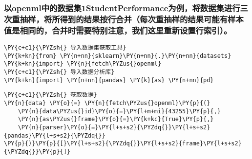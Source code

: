     \hypertarget{ux4ee5openmlux4e2dux7684ux6570ux636eux96c61studentperformanceux4e3aux4f8bux5c06ux6570ux636eux96c6ux8fdbux884cux4e09ux6b21ux91cdux62bdux6837ux5c06ux6240ux5f97ux5230ux7684ux7ed3ux679cux6309ux884cux5408ux5e76ux6bcfux6b21ux91cdux62bdux6837ux7684ux7ed3ux679cux53efux80fdux6709ux6837ux672cux503cux662fux76f8ux540cux7684ux5408ux5e76ux65f6ux9700ux8981ux7279ux522bux6ce8ux610fux6211ux4eecux8fd9ux91ccux91cdux65b0ux8bbeux7f6eux884cux7d22ux5f15}{%
\subsubsection{以openml中的数据集1StudentPerformance为例，将数据集进行三次重抽样，将所得到的结果按行合并（每次重抽样的结果可能有样本值是相同的，合并时需要特别注意，我们这里重新设置行索引）。}\label{ux4ee5openmlux4e2dux7684ux6570ux636eux96c61studentperformanceux4e3aux4f8bux5c06ux6570ux636eux96c6ux8fdbux884cux4e09ux6b21ux91cdux62bdux6837ux5c06ux6240ux5f97ux5230ux7684ux7ed3ux679cux6309ux884cux5408ux5e76ux6bcfux6b21ux91cdux62bdux6837ux7684ux7ed3ux679cux53efux80fdux6709ux6837ux672cux503cux662fux76f8ux540cux7684ux5408ux5e76ux65f6ux9700ux8981ux7279ux522bux6ce8ux610fux6211ux4eecux8fd9ux91ccux91cdux65b0ux8bbeux7f6eux884cux7d22ux5f15}}

    \begin{tcolorbox}[breakable, size=fbox, boxrule=1pt, pad at break*=1mm,colback=cellbackground, colframe=cellborder]
\begin{Verbatim}[commandchars=\\\{\}]
\PY{c+c1}{\PYZsh{} 导入数据集获取工具}
\PY{k+kn}{from} \PY{n+nn}{sklearn}\PY{n+nn}{.}\PY{n+nn}{datasets} \PY{k+kn}{import} \PY{n}{fetch\PYZus{}openml}
\PY{c+c1}{\PYZsh{} 导入数据分析库}
\PY{k+kn}{import} \PY{n+nn}{pandas} \PY{k}{as} \PY{n+nn}{pd}
\end{Verbatim}
\end{tcolorbox}

    \begin{tcolorbox}[breakable, size=fbox, boxrule=1pt, pad at break*=1mm,colback=cellbackground, colframe=cellborder]
\begin{Verbatim}[commandchars=\\\{\}]
\PY{c+c1}{\PYZsh{} 获取数据}
\PY{n}{data} \PY{o}{=} \PY{n}{fetch\PYZus{}openml}\PY{p}{(}
    \PY{n}{data\PYZus{}id}\PY{o}{=}\PY{l+m+mi}{43255}\PY{p}{,}
    \PY{n}{as\PYZus{}frame}\PY{o}{=}\PY{k+kc}{True}\PY{p}{,}
    \PY{n}{parser}\PY{o}{=}\PY{l+s+s2}{\PYZdq{}}\PY{l+s+s2}{pandas}\PY{l+s+s2}{\PYZdq{}}
\PY{p}{)}\PY{p}{[}\PY{l+s+s2}{\PYZdq{}}\PY{l+s+s2}{frame}\PY{l+s+s2}{\PYZdq{}}\PY{p}{]}
\end{Verbatim}
\end{tcolorbox}


